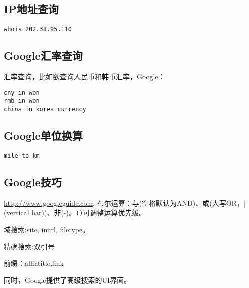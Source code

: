 \subsection{IP地址查询}
\begin{verbatim}
whois 202.38.95.110
\end{verbatim}

\subsection{Google汇率查询}
汇率查询，比如欲查询人民币和韩币汇率，Google：
\begin{verbatim}
cny in won
rmb in won
china in korea currency
\end{verbatim}

\subsection{Google单位换算}
\begin{verbatim}
mile to km
\end{verbatim}

\subsection{Google技巧}
\url{http://www.googleguide.com}.
布尔运算：与(空格默认为AND)、或(大写OR，|(vertical bar))、非(-)。\verb+()+可调整运算优先级。

域搜索:site, inurl, filetype。

精确搜索:双引号

前缀：allintitle,link

同时，Google提供了高级搜索的UI界面。

























